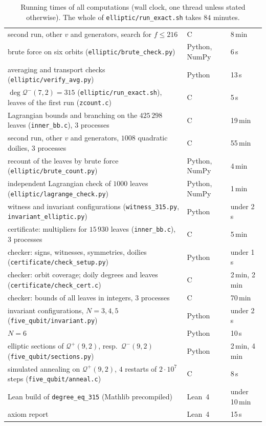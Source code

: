\documentclass[11pt]{article}
\theoremstyle{definition}
\theoremstyle{remark}
\newcommand{\Qp}{\mathcal{Q}^{+}}
\newcommand{\Qm}{\mathcal{Q}^{-}}
\newcommand{\dg}{\operatorname{deg}}
\begin{document}
\begin{table}[ht]
{\begin{tabular}{@{}lll@{}}
\quad second run, other $v$ and generators, search for $f\le216$ & C & 8\,min \\
\quad brute force on six orbits (\texttt{elliptic/brute\_check.py}) & Python, NumPy & 6\,s \\
averaging and transport checks (\texttt{elliptic/verify\_avg.py}) & Python & 13\,s \\
$\dg\Qm(7,2)=315$ (\texttt{elliptic/run\_exact.sh}), leaves of the first run (\texttt{zcount.c}) & C & 5\,s \\
\quad Lagrangian bounds and branching on the $425\,298$ leaves (\texttt{inner\_bb.c}), $3$ processes & C & 19\,min \\
\quad second run, other $v$ and generators, $1008$ quadratic doilies, $3$ processes & C & 55\,min \\
\quad recount of the leaves by brute force (\texttt{elliptic/brute\_count.py}) & Python, NumPy & 4\,min \\
\quad independent Lagrangian check of $1000$ leaves (\texttt{elliptic/lagrange\_check.py}) & Python, NumPy & 1\,min \\
\quad witness and invariant configurations (\texttt{witness\_315.py}, \texttt{invariant\_elliptic.py}) & Python & under 2\,s \\
\quad certificate: multipliers for $15\,930$ leaves (\texttt{inner\_bb.c}), $3$ processes & C & 5\,min \\
\quad checker: signs, witnesses, symmetries, doilies (\texttt{certificate/check\_setup.py}) & Python & under 1\,s \\
\quad checker: orbit coverage; doily degrees and leaves (\texttt{certificate/check\_cert.c}) & C & 2\,min, 2\,min \\
\quad checker: bounds of all leaves in integers, $3$ processes & C & 70\,min \\
invariant configurations, $N=3,4,5$ (\texttt{five\_qubit/invariant.py}) & Python & under 2\,s \\
\quad $N=6$ & Python & 10\,s \\
elliptic sections of $\Qp(9,2)$, resp.\ $\Qm(9,2)$ (\texttt{five\_qubit/sections.py}) & Python & 2\,min, 4\,min \\
simulated annealing on $\Qp(9,2)$, $4$ restarts of $2\cdot10^7$ steps (\texttt{five\_qubit/anneal.c}) & C & 8\,s \\
Lean build of \texttt{degree\_eq\_315} (Mathlib precompiled) & Lean~4 & under 10\,min \\
axiom report & Lean~4 & 15\,s \\
\bottomrule
\end{tabular}}
\caption{Running times of all computations (wall clock, one thread unless stated otherwise). The whole of \texttt{elliptic/run\_exact.sh} takes $84$ minutes.}
\label{tab:costs}
\end{table}
\end{document}
